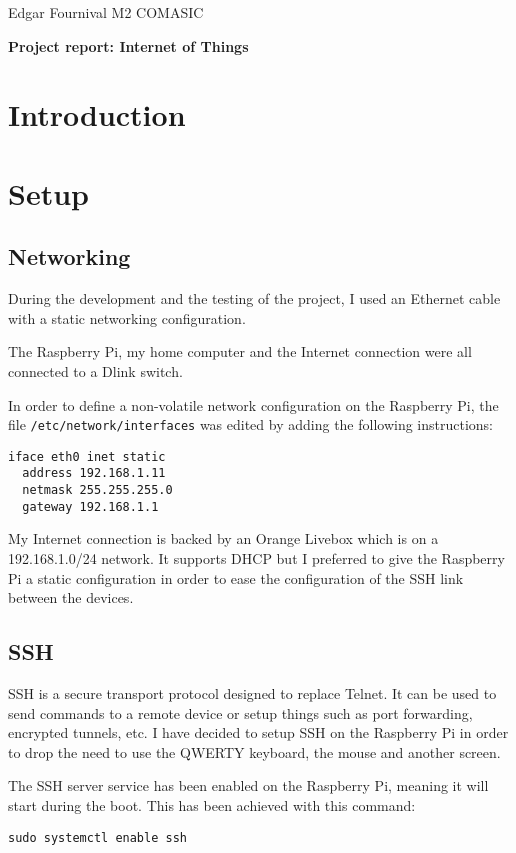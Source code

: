 \documentclass[11pt,a4paper]{article}
\newcommand{\rpi}{Raspberry Pi\xspace}
\begin{document}
Edgar Fournival \hfill M2 COMASIC

\begin{center}
  \medskip
  \huge\textbf{Project report: Internet of Things}
  \medskip
\end{center}

\section*{Introduction}

\section{Setup}

\subsection{Networking}

During the development and the testing of the project, I used an Ethernet cable with a static networking configuration.

The \rpi, my home computer and the Internet connection were all connected to a Dlink switch.

In order to define a non-volatile network configuration on the \rpi, the file \texttt{/etc/network/\allowbreak interfaces} was edited by adding the following instructions:
\begin{verbatim}
iface eth0 inet static
  address 192.168.1.11
  netmask 255.255.255.0
  gateway 192.168.1.1
\end{verbatim}

My Internet connection is backed by an Orange Livebox which is on a 192.168.1.0/24 network. It supports DHCP but I preferred to give the \rpi a static configuration in order to ease the configuration of the SSH link between the devices.

\subsection{SSH}

SSH is a secure transport protocol designed to replace Telnet. It can be used to send commands to a remote device or setup things such as port forwarding, encrypted tunnels, etc. I have decided to setup SSH on the \rpi in order to drop the need to use the QWERTY keyboard, the mouse and another screen.

The SSH server service has been enabled on the \rpi, meaning it will start during the boot. This has been achieved with this command:
\begin{verbatim}
sudo systemctl enable ssh
\end{verbatim}
\end{document}
